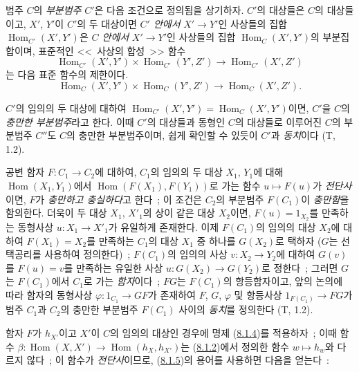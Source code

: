 \begin{env}[8.1.5]
\label{0.8.1.5-fr}
범주 $C$의 \emph{부분범주} $C'$은 다음 조건으로 정의됨을 상기하자.
$C'$의 대상들은 $C$의 대상들이고, $X'$, $Y'$이 $C'$의 두 대상이면
\emph{$C'$ 안에서} $X'\to Y'$인 사상들의 집합
$\operatorname{Hom}_{C'}(X',Y')$은 \emph{$C$ 안에서} $X'\to Y'$인
사상들의 집합 $\operatorname{Hom}_C(X',Y')$의 부분집합이며, 표준적인
<<~사상의 합성~>> 함수
\[
  \operatorname{Hom}_{C'}(X',Y')\times\operatorname{Hom}_{C'}(Y',Z')
  \to\operatorname{Hom}_{C'}(X',Z')
\]
는 다음 표준 함수의 제한이다.
\[
  \operatorname{Hom}_C(X',Y')\times\operatorname{Hom}_C(Y',Z')
  \to\operatorname{Hom}_C(X',Z').
\]

$C'$의 임의의 두 대상에 대하여
$\operatorname{Hom}_{C'}(X',Y')=\operatorname{Hom}_C(X',Y')$이면,
$C'$을 $C$의 \emph{충만한 부분범주}라고 한다. 이때 $C'$의 대상들과
동형인 $C$의 대상들로 이루어진 $C$의 부분범주 $C''$도 $C$의 충만한
부분범주이며, 쉽게 확인할 수 있듯이 $C'$과 \emph{동치}이다 (T, 1.2).

공변 함자 $F:C_1\to C_2$에 대하여, $C_1$의 임의의 두 대상 $X_1$,
$Y_1$에 대해 $\operatorname{Hom}(X_1,Y_1)$에서
$\operatorname{Hom}(F(X_1),F(Y_1))$로 가는 함수 $u\mapsto F(u)$가
\emph{전단사}이면, $F$가 \emph{충만하고 충실하다}고 한다~; 이 조건은
$C_2$의 부분범주 $F(C_1)$이 \emph{충만함}을 함의한다. 더욱이 두 대상
$X_1$, $X'_1$의 상이 같은 대상 $X_2$이면, $F(u)=1_{X_2}$를 만족하는
동형사상 $u:X_1\to X'_1$가 유일하게 존재한다. 이제 $F(C_1)$의 임의의
대상 $X_2$에 대하여 $F(X_1)=X_2$를 만족하는 $C_1$의 대상 $X_1$ 중
하나를 $G(X_2)$로 택하자 ($G$는 선택공리를 사용하여 정의한다)~;
$F(C_1)$의 임의의 사상 $v:X_2\to Y_2$에 대하여 $G(v)$를
$F(u)=v$를 만족하는 유일한 사상 $u:G(X_2)\to G(Y_2)$로 정한다~;
그러면 $G$는 $F(C_1)$에서 $C_1$로 가는 \emph{함자}이다~;
$FG$는 $F(C_1)$의 항등함자이고, 앞의 논의에 따라 함자의 동형사상
$\varphi:1_{C_1}\to GF$가 존재하여 $F$, $G$, $\varphi$ 및 항등사상
$1_{F(C_1)}\to FG$가 범주 $C_1$과 $C_2$의 충만한 부분범주
$F(C_1)$ 사이의 \emph{동치}를 정의한다 (T, 1.2).
\end{env}

\begin{env}[8.1.6]
\label{0.8.1.6-fr}
함자 $F$가 $h_{X'}$이고 $X'$이 $C$의 임의의 대상인 경우에 명제
(\hyperref[0.8.1.4-fr]{8.1.4})를 적용하자~; 이때 함수
$\beta:\operatorname{Hom}(X,X')\to\operatorname{Hom}(h_X,h_{X'})$는
(\hyperref[0.8.1.2-fr]{8.1.2})에서 정의한 함수 $w\mapsto h_w$와
다르지 않다~; 이 함수가 \emph{전단사}이므로,
(\hyperref[0.8.1.5-fr]{8.1.5})의 용어를 사용하면 다음을 얻는다~:
\end{env}


